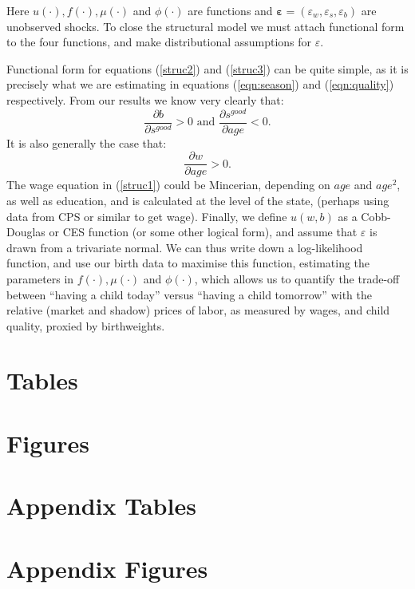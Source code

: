 \documentclass[a4paper, 11 pt]{article}
\theoremstyle{plain}
\begin{document}
\begin{spacing}{1.2}
Here $u(\cdot), f(\cdot), \mu(\cdot)$ and $\phi(\cdot)$ are functions and 
$\mathbf{\varepsilon}=(\varepsilon_w,\varepsilon_s,\varepsilon_b)$ are 
unobserved shocks.  To close the structural model we must attach functional
form to the four functions, and make distributional assumptions for $\varepsilon$.

Functional form for equations (\ref{struc2}) and (\ref{struc3}) can be quite simple, 
as it is precisely what we are estimating in equations (\ref{eqn:season}) and 
(\ref{eqn:quality}) respectively.  From our results we know very clearly that:
\[
\frac{\partial b}{\partial s^{good}}>0 \text{\ and \ }
\frac{\partial s^{good}}{\partial age}<0.
\]
It is also generally the case that:
\[
\frac{\partial w}{\partial age}>0.
\]
The wage equation in (\ref{struc1}) could be Mincerian, depending on $age$ and 
$age^2$, as well as education, and is calculated at the level of the state, 
(perhaps using data from CPS or similar to get wage).  Finally, we define $u(w,b)$ 
as a Cobb-Douglas
or CES function (or some other logical form), and assume that $\varepsilon$ is
drawn from a trivariate normal.  We can thus write down a log-likelihood function,
and use our birth data to maximise this function, estimating the parameters in
$f(\cdot), \mu(\cdot)$ and $\phi(\cdot)$, which allows us to quantify the
trade-off between ``having a child today'' versus ``having a child tomorrow'' 
with the relative (market and shadow) prices of labor, as measured by wages, and 
child quality, proxied by birthweights.

\newpage

\newpage
\section*{Tables}


\newpage
\section*{Figures}


\clearpage
\appendix
\section{Appendix Tables}


\clearpage
\appendix
\section{Appendix Figures}




\end{spacing}
\end{document}
